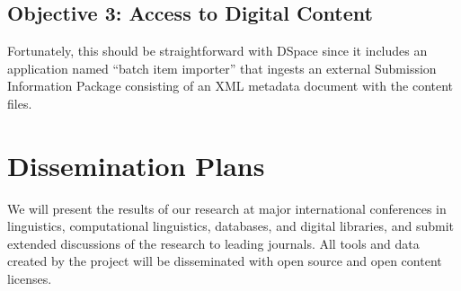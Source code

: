 \vspace{1in}

\subsection*{Objective 3: Access to Digital Content}

\vspace{1in}

Fortunately, this
should be straightforward with DSpace since it includes an application
named ``batch item importer'' that ingests an external Submission Information Package consisting of an XML metadata document with the content files.

\section{Dissemination Plans}
\label{sec:dissemination}

We will present the results of our research at major international
conferences in linguistics, computational linguistics, databases, and
digital libraries, and submit extended discussions of the research to
leading journals.  All tools and data created by the project will be
disseminated with open source and open content licenses.

